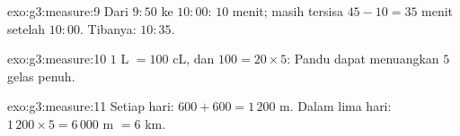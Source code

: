 \begin{solution}{exo:g3:measure:9}
Dari $9{:}50$ ke $10{:}00$: $10$ menit; masih tersisa
$45 - 10 = 35$ menit setelah $10{:}00$. Tibanya: $10{:}35$.
\end{solution}

\begin{solution}{exo:g3:measure:10}
$1$ L $= 100$ cL, dan $100 = 20 \times 5$: Pandu dapat menuangkan
$5$ gelas penuh.
\end{solution}

\begin{solution}{exo:g3:measure:11}
Setiap hari: $600 + 600 = 1\,200$ m. Dalam lima hari:
$1\,200 \times 5 = 6\,000$ m $= 6$ km.

\end{solution}
